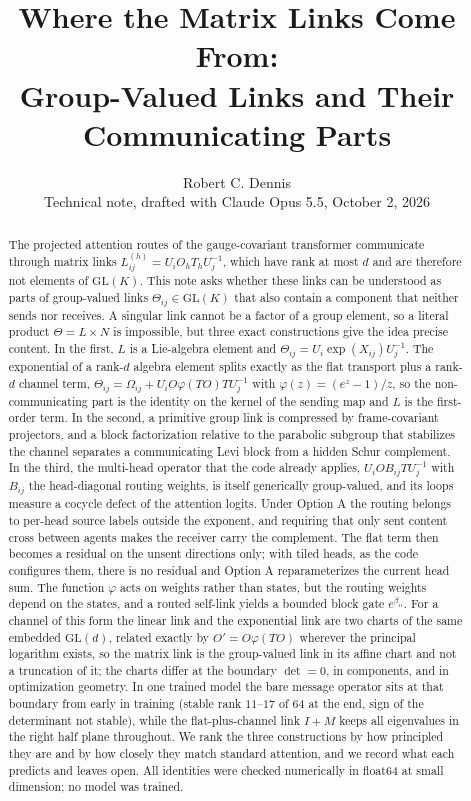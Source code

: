 \documentclass[11pt]{article}
\title{Where the Matrix Links Come From:\\Group-Valued Links and Their Communicating Parts}
\author{Robert C. Dennis\\\small Technical note, drafted with Claude Opus 5.5, October 2, 2026}
\date{}
\theoremstyle{definition}
\theoremstyle{remark}
\newcommand{\GL}{\mathrm{GL}}
\begin{document}
\maketitle

\begin{abstract}
The projected attention routes of the gauge-covariant transformer communicate through matrix links $L_{ij}^{(h)}=U_iO_hT_hU_j^{-1}$, which have rank at most $d$ and are therefore not elements of $\GL(K)$. This note asks whether these links can be understood as parts of group-valued links $\Theta_{ij}\in\GL(K)$ that also contain a component that neither sends nor receives. A singular link cannot be a factor of a group element, so a literal product $\Theta=L\times N$ is impossible, but three exact constructions give the idea precise content. In the first, $L$ is a Lie-algebra element and $\Theta_{ij}=U_i\exp(X_{ij})U_j^{-1}$. The exponential of a rank-$d$ algebra element splits exactly as the flat transport plus a rank-$d$ channel term, $\Theta_{ij}=\Omega_{ij}+U_iO\varphi(TO)TU_j^{-1}$ with $\varphi(z)=(e^z-1)/z$, so the non-communicating part is the identity on the kernel of the sending map and $L$ is the first-order term. In the second, a primitive group link is compressed by frame-covariant projectors, and a block factorization relative to the parabolic subgroup that stabilizes the channel separates a communicating Levi block from a hidden Schur complement. In the third, the multi-head operator that the code already applies, $U_iOB_{ij}TU_j^{-1}$ with $B_{ij}$ the head-diagonal routing weights, is itself generically group-valued, and its loops measure a cocycle defect of the attention logits. Under Option A the routing belongs to per-head source labels outside the exponent, and requiring that only sent content cross between agents makes the receiver carry the complement. The flat term then becomes a residual on the unsent directions only; with tiled heads, as the code configures them, there is no residual and Option A reparameterizes the current head sum. The function $\varphi$ acts on weights rather than states, but the routing weights depend on the states, and a routed self-link yields a bounded block gate $e^{\beta_{ii}}$. For a channel of this form the linear link and the exponential link are two charts of the same embedded $\GL(d)$, related exactly by $O'=O\varphi(TO)$ wherever the principal logarithm exists, so the matrix link is the group-valued link in its affine chart and not a truncation of it; the charts differ at the boundary $\det=0$, in components, and in optimization geometry. In one trained model the bare message operator sits at that boundary from early in training (stable rank $11$--$17$ of $64$ at the end, sign of the determinant not stable), while the flat-plus-channel link $I+M$ keeps all eigenvalues in the right half plane throughout. We rank the three constructions by how principled they are and by how closely they match standard attention, and we record what each predicts and leaves open. All identities were checked numerically in float64 at small dimension; no model was trained.
\end{abstract}
\end{document}
